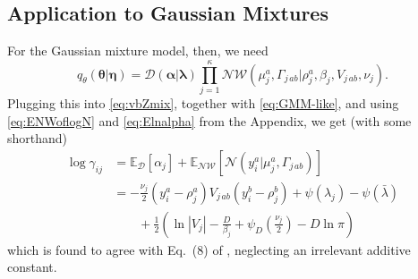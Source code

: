 \documentclass[aps,showpacs,twocolumn,prd,superscriptaddress,nofootinbib]{revtex4}
\newcommand{\be}{\begin{equation}}
\newcommand{\ee}{\end{equation}}
\newcommand{\nn}{\nonumber}
\newcommand{\E}[1]{{\mathbb E}_{#1}\!}
\begin{document}
\subsection{Application to Gaussian Mixtures}

For the Gaussian mixture model, then, we need
\be
q_\theta(\bm\theta|\bm\eta)=\mathcal{D}\left(\bm\alpha|\bm\lambda\right)\prod_{j=1}^\kappa\mathcal{NW}\left(\mu_j^a,\Gamma_{j\,ab}|\rho_j^a,\beta_j,V_{j\,ab},\nu_j\right).\label{eq:q-th-GMM}
\ee
Plugging this into \eqref{eq:vbZmix}, together with \eqref{eq:GMM-like}, and using \eqref{eq:ENWoflogN} and \eqref{eq:Elnalpha} from the Appendix, we get (with some shorthand)
\begin{align}
  \log \gamma_{ij}&=\E{\mathcal{D}}\left[\alpha_j\right]+\E{\mathcal{NW}}\left[\mathcal{N}(y_i^a|\mu_j^a,\Gamma_{j\,ab})\right]\nn\\
  &=
  -\frac{\nu_j}2(y_i^a-\rho_j^a)V_{j\,ab}(y_i^b-\rho_j^b)+\psi(\lambda_j)-\psi(\bar\lambda)\nn\\
  &\qquad
  +\frac12\left(\ln|V_j|-\frac D{\beta_j}+\psi_D\left(\frac{\nu_j}2\right)-D\ln\pi \right)\label{eq:GM-parition}
\end{align}
which is found to agree with Eq.~(8) of \cite{Attias2000}, neglecting an irrelevant additive constant.
\end{document}
